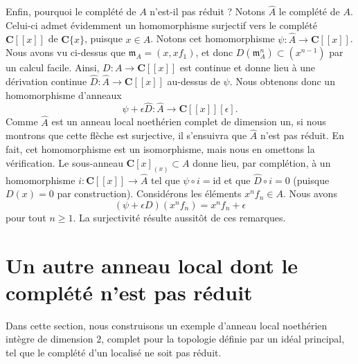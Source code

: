 \medskip\noindent
Enfin, pourquoi le complété de $A$ n'est-il pas réduit ? Notons $\hat A$ le
complété de $A$. Celui-ci admet évidemment un homomorphisme surjectif vers le complété
$\mathbf{C}[[x]]$ de $\mathbf{C}\{x\}$, puisque $x \in A$. Notons
cet homomorphisme $\psi : \hat A \to \mathbf{C}[[x]]$.
Nous avons vu ci-dessus que $\mathfrak m_A = (x, xf_1)$,
et donc $D(\mathfrak m_A^n) \subset (x^{n - 1})$ par un calcul
facile. Ainsi, $D : A \to \mathbf{C}[[x]]$ est continue et
donne lieu à une dérivation continue $\hat D : \hat A \to \mathbf{C}[[x]]$
au-dessus de $\psi$. Nous obtenons donc un homomorphisme d'anneaux
$$
\psi + \epsilon \hat D :
\hat A
\longrightarrow
\mathbf{C}[[x]][\epsilon].
$$
Comme $\hat A$ est un anneau local noethérien complet de dimension un, si nous
montrons que cette flèche est surjective, il s'ensuivra que $\hat A$
n'est pas réduit. En fait, cet homomorphisme est un isomorphisme, mais nous en omettons
la vérification. Le sous-anneau $\mathbf{C}[x]_{(x)} \subset A$
donne lieu, par complétion, à un homomorphisme $i : \mathbf{C}[[x]] \to \hat A$ tel
que $\psi \circ i = \text{id}$ et que $\hat D \circ i = 0$
(puisque $D(x) = 0$ par construction). Considérons les éléments $x^nf_n \in A$.
Nous avons
$$
(\psi + \epsilon D)(x^nf_n) = x^n f_n + \epsilon
$$
pour tout $n \geq 1$. La surjectivité résulte aussitôt de ces remarques.





\section{Un autre anneau local dont le complété n'est pas réduit}
\label{section-another-local-completion-nonreduced}

\noindent
Dans cette section, nous construisons un exemple d'anneau local noethérien intègre
de dimension $2$, complet pour la topologie définie par un idéal principal,
tel que le complété d'un localisé ne soit pas réduit.

